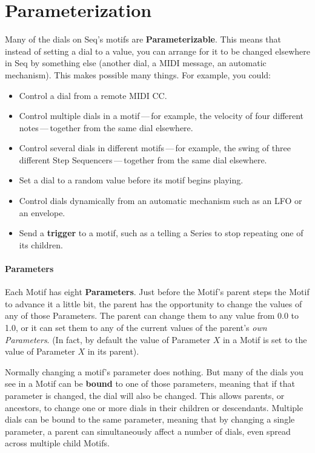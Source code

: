\documentclass[twoside,10pt]{article}
\begin{document}
\clearpage\section{Parameterization}
\label{parameters}

Many of the dials on Seq's motifs are {\bf Parameterizable}.  This means that instead of setting a dial to a value, you can arrange for it to be changed elsewhere in Seq by something else (another dial, a MIDI message, an automatic mechanism).  This makes possible many things.  For example, you could:

\begin{itemize}
\item Control a dial from a remote MIDI CC.
\item Control multiple dials in a motif\,---\,for example, the velocity of four different notes\,---\,together from the same dial elsewhere.
\item Control several dials in different motifs\,---\,for example, the swing of three different Step Sequencers\,---\,together from the same dial elsewhere.
\item Set a dial to a random value before its motif begins playing.
\item Control dials dynamically from an automatic mechanism such as an LFO or an envelope.
\item Send a {\bf trigger} to a motif, such as a telling a Series to stop repeating one of its children.
\end{itemize}


\paragraph{Parameters} Each Motif has eight {\bf Parameters}.   Just before the Motif's parent steps the Motif to advance it a little bit, the parent has the opportunity to change the values of any of those Parameters.  The parent can change them to any value from 0.0 to 1.0, or it can set them to any of the current values of the parent's {\it own Parameters}.  (In fact, by default the value of Parameter \(X\) in a Motif is set to the value of Parameter \(X\) in its parent).

Normally changing a motif's parameter does nothing.  But many of the dials you see in a Motif can be {\bf bound} to one of those parameters, meaning that if that parameter is changed, the dial will also be changed.  This allows parents, or ancestors, to change one or more dials in their children or descendants.  Multiple dials can be bound to the same parameter, meaning that by changing a single parameter, a parent can simultaneously affect a number of dials, even spread across multiple child Motifs.
\end{document}
